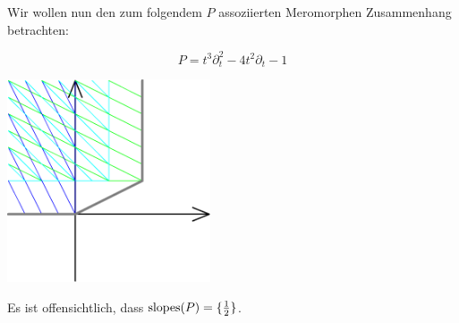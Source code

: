 Wir wollen nun den zum folgendem $P$ assoziierten Meromorphen Zusammenhang
betrachten:\\
\begin{minipage}[hbt]{0,39\textwidth}
  \[ P= t^3\partial_t^2-4t^2\partial_t-1 \]
\end{minipage}
\begin{minipage}[hbt]{0,59\textwidth}
  \begin{center}
    \includegraphics[width=6cm]{beispiele/img/formal_b.png}
  \end{center}
\end{minipage}
Es ist offensichtlich, dass $\operatorname{slopes}(P)=\{\frac{1}{2}\}$.

